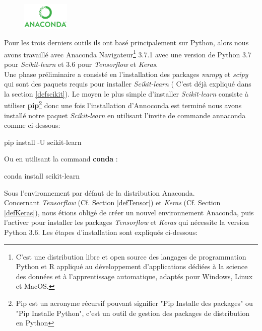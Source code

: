 \begin{figure}
    \includegraphics[width=0.2\textwidth]{img/condalogo.png}
\end{figure}
Pour les trois derniers outils ils ont basé principalement sur Python, alors nous avons travaillé avec Anaconda Navigateur\footnote{C'est une distribution libre et open source des langages de programmation Python et R appliqué au développement d'applications dédiées à la science des données et à l'apprentissage automatique, adaptés pour Windows, Linux et MacOS.} 3.7.1 avec une version de Python 3.7 pour \textit{Scikit-learn} et 3.6 pour \textit{Tensorflow} et \textit{Keras}.\\

Une phase préliminaire a consisté en l'installation des packages \textit{numpy} et \textit{scipy} qui sont des paquets requis pour installer \textit{Scikit-learn} ( C'est déjà expliqué dans la section \ref{defscikit}). Le moyen le plus simple d’installer \textit{Scikit-learn} consiste à utiliser \textbf{pip}\footnote{
Pip est un acronyme récursif pouvant signifier "Pip Installe des packages" ou "Pip Installe Python", c'est un outil de gestion des packages de distribution en Python} donc une fois l’installation d’Annoconda est terminé nous avons installé notre paquet \textit{Scikit-learn} en utilisant l’invite de commande annaconda comme ci-dessous:
\begin{tcolorbox}
\normalsize pip install -U scikit-learn
\end{tcolorbox}	
Ou en utilisant la command \textbf{conda} :
\begin{tcolorbox}
\normalsize conda install scikit-learn
\end{tcolorbox}	
Sous l’environnement par défaut de la distribution Anaconda. \\

Concernant \textit{Tensorflow} (Cf. Section \ref{defTensor}) et \textit{Keras} (Cf. Section \ref{defKeras}), nous étions obligé de créer un nouvel environnement Anaconda, puis l'activer pour installer les packages \textit{Tensorflow} et \textit{Keras} qui nécessite la version Python 3.6. Les étapes d'installation sont expliqués ci-dessous: \\

